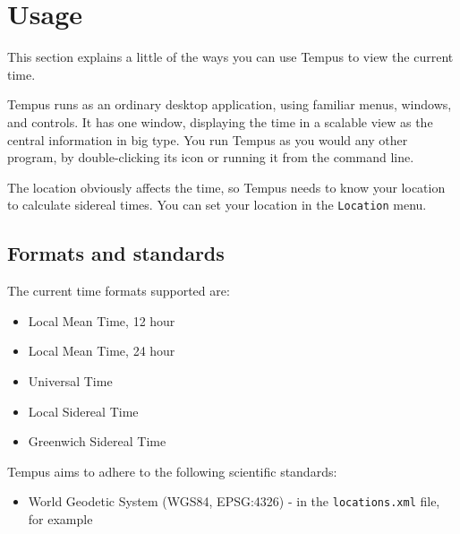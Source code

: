 \section{Usage}

This section explains a little of the ways you can use Tempus to view the current time.

Tempus runs as an ordinary desktop application, using familiar menus, windows, and controls. It has one window, displaying the time in a scalable view as the central information in big type.
You run Tempus as you would any other program, by double-clicking its icon or running it from the command line. 

The location obviously affects the time, so Tempus needs to know your location to calculate sidereal times. You can set your location in the \texttt{Location} menu.


\subsection{Formats and standards}

The current time formats supported are:
\begin{itemize}
    \item Local Mean Time, 12 hour
    \item Local Mean Time, 24 hour
    \item Universal Time
    \item Local Sidereal Time
    \item Greenwich Sidereal Time
\end{itemize}

Tempus aims to adhere to the following scientific standards:

\begin{itemize}
    \item World Geodetic System (WGS84, EPSG:4326) - in the \texttt{locations.xml} file, for example
\end{itemize}
